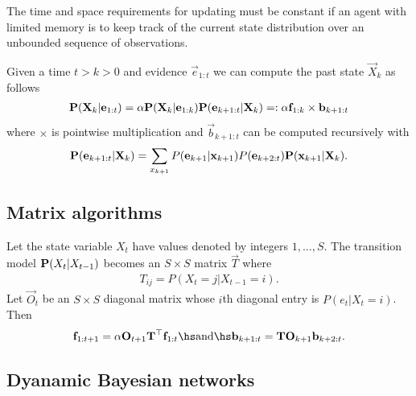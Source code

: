 \documentclass{article}
\begin{document}
\begin{theorem}
    The time and space requirements for updating must be constant if
    an agent with limited memory is to keep track of the current state
    distribution over an unbounded sequence of observations.
\end{theorem}

\begin{theorem}[R\&N p. 574]
    Given a time $t>k>0$ and evidence $\vec e_{1:t}$ we can compute the
    past state $\vec X_k$ as follows
    \begin{align*}
        \P(\vec X_k|\vec e_{1:t}) = \alpha\P(\vec X_k|\vec e_{1:k})
        \P(\vec e_{k+1:t} | \vec X_k) =: \alpha\vec f_{1:k}\times\vec b_{k+1:t}
    \end{align*}
    where $\times$ is pointwise multiplication and $\vec b_{k+1:t}$ can be
    computed recursively with
    \begin{align*}
        \P(\vec e_{k+1:t}|\vec X_k) = \sum_{x_{k+1}}
        P(\vec e_{k+1}|\vec x_{k+1})P(\vec e_{k+2:t})\P(\vec x_{k+1}|\vec X_k).
    \end{align*}
\end{theorem}

\subsection{Matrix algorithms}

\begin{theorem}[R\&N p. 579]
    Let the state variable $X_t$ have values denoted by
    integers $1,...,S$. The transition model $\P(X_t|X_{t-1})$
    becomes an $S\times S$ matrix $\vec T$ where
    \begin{align*}
        T_{ij} = P(X_t=j|X_{t-1}=i).
    \end{align*}
    Let $\vec O_t$ be an $S\times S$ diagonal matrix whose $i$th
    diagonal entry is $P(e_t|X_t=i)$. Then
    \begin{align*}
        \vec f_{1:t+1} = \alpha \vec O_{t+1}\vec T^\top \vec f_{1:t}
        \hs\text{and}\hs
        \vec b_{k+1:t} = \vec T\vec O_{k+1}\vec b_{k+2:t}.
    \end{align*}
\end{theorem}

\subsection{Dyanamic Bayesian networks}
\end{document}
